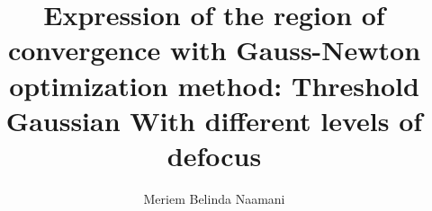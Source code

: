 \documentclass[10pt]{article}
\begin{document}
\title{Expression of the region of convergence with Gauss-Newton optimization method: Threshold Gaussian With different levels of defocus}
\date{}
\author{Meriem Belinda Naamani}
\maketitle




\end{document}
